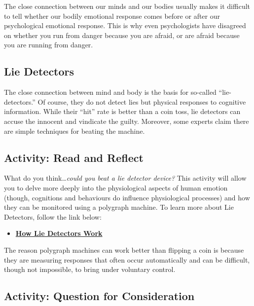 \documentclass[
]{book}
\providecommand{\tightlist}{%
  \setlength{\itemsep}{0pt}\setlength{\parskip}{0pt}}
\begin{document}
The close connection between our minds and our bodies usually makes it difficult to tell whether our bodily emotional response comes before or after our psychological emotional response. This is why even psychologists have disagreed on whether you run from danger because you are afraid, or are afraid because you are running from danger.

\hypertarget{lie-detectors}{%
\subsection*{Lie Detectors}\label{lie-detectors}}

The close connection between mind and body is the basis for so-called ``lie-detectors.'' Of course, they do not detect lies but physical responses to cognitive information. While their ``hit'' rate is better than a coin toss, lie detectors can accuse the in­nocent and vindicate the guilty. Moreover, some experts claim there are simple techniques for beating the ma­chine.

\hypertarget{activity-read-and-reflect-12}{%
\subsection*{Activity: Read and Reflect}\label{activity-read-and-reflect-12}}

\begin{reflect}
What do you think\ldots{}\emph{could you beat a lie detector device?} This activity will allow you to delve more deeply into the physiological aspects of human emotion (though, cognitions and behaviours do influence physiological processes) and how they can be monitored using a polygraph machine. To learn more about Lie Detectors, follow the link below:

\begin{itemize}
\tightlist
\item
  \href{https://people.howstuffworks.com/lie-detector.htm}{\textbf{How Lie Detectors Work}}
\end{itemize}

The reason polygraph machines can work better than flipping a coin is because they are measuring responses that often occur automatically and can be difficult, though not impossible, to bring under voluntary control.
\end{reflect}

\hypertarget{activity-question-for-consideration-4}{%
\subsection*{Activity: Question for Consideration}\label{activity-question-for-consideration-4}}
\end{document}
